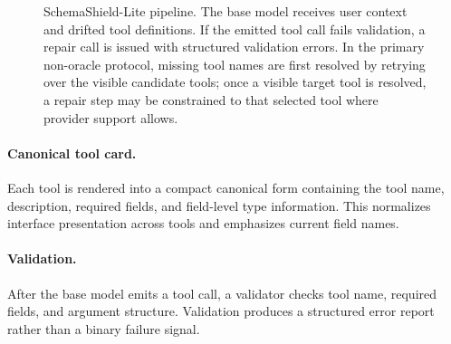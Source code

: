 \documentclass[runningheads]{llncs}
\newcommand{\method}{SchemaShield-Lite\xspace}
\begin{document}
\begin{figure}[t]
\centering
{}
\caption{\method pipeline. The base model receives user context and drifted tool
definitions. If the emitted tool call fails validation, a repair call is issued
with structured validation errors. In the primary non-oracle protocol, missing tool
names are first resolved by retrying over the visible candidate tools; once a
visible target tool is resolved, a repair step may be constrained to that selected
tool where provider support allows.}
\label{fig:pipeline}
\end{figure}


\paragraph{Canonical tool card.}
Each tool is rendered into a compact canonical form containing the tool name,
description, required fields, and field-level type information. This normalizes
interface presentation across tools and emphasizes current field names.

\paragraph{Validation.}
After the base model emits a tool call, a validator checks tool name, required
fields, and argument structure. Validation produces a structured error report rather
than a binary failure signal.
\end{document}
